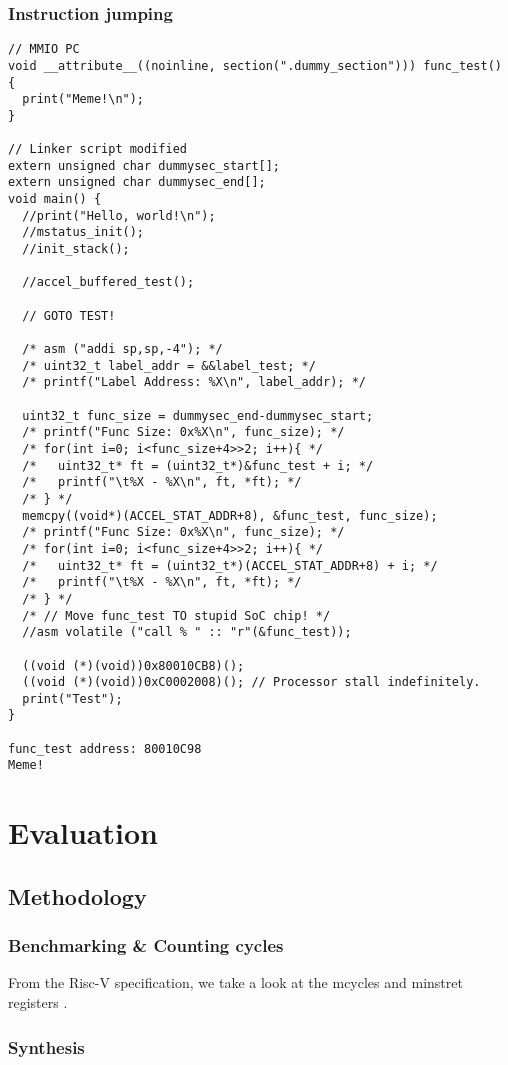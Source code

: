 \documentclass[a4paper,9pt]{report}
\begin{document}
\subsection{Instruction jumping}

\begin{verbatim}
// MMIO PC
void __attribute__((noinline, section(".dummy_section"))) func_test() {
  print("Meme!\n");
}

// Linker script modified
extern unsigned char dummysec_start[];
extern unsigned char dummysec_end[];
void main() {
  //print("Hello, world!\n");
  //mstatus_init();
  //init_stack();

  //accel_buffered_test();

  // GOTO TEST!

  /* asm ("addi sp,sp,-4"); */
  /* uint32_t label_addr = &&label_test; */
  /* printf("Label Address: %X\n", label_addr); */

  uint32_t func_size = dummysec_end-dummysec_start;
  /* printf("Func Size: 0x%X\n", func_size); */
  /* for(int i=0; i<func_size+4>>2; i++){ */
  /*   uint32_t* ft = (uint32_t*)&func_test + i; */
  /*   printf("\t%X - %X\n", ft, *ft); */
  /* } */
  memcpy((void*)(ACCEL_STAT_ADDR+8), &func_test, func_size);
  /* printf("Func Size: 0x%X\n", func_size); */
  /* for(int i=0; i<func_size+4>>2; i++){ */
  /*   uint32_t* ft = (uint32_t*)(ACCEL_STAT_ADDR+8) + i; */
  /*   printf("\t%X - %X\n", ft, *ft); */
  /* } */
  /* // Move func_test TO stupid SoC chip! */
  //asm volatile ("call % " :: "r"(&func_test));

  ((void (*)(void))0x80010CB8)();
  ((void (*)(void))0xC0002008)(); // Processor stall indefinitely.
  print("Test");
}

func_test address: 80010C98
Meme!
\end{verbatim}




\chapter{Evaluation} 
\section{Methodology}
\subsection{Benchmarking \& Counting cycles}
From the Risc-V specification, we take a look at the mcycles and minstret
registers
.
\subsection{Synthesis}
\end{document}
